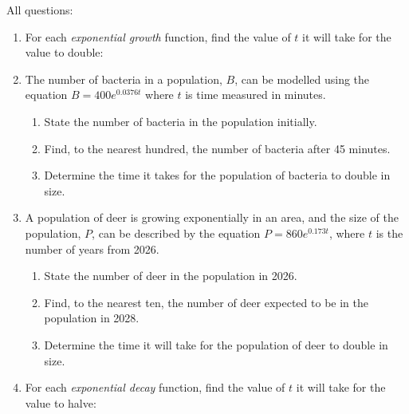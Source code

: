 \documentclass[
  11pt,
  openany]{book}
\begin{document}
All questions: \faCalculator

\vspace{-0.2cm}

\begin{enumerate}
    \item For each \textit{exponential growth} function, find the value of $t$ it will take for the value to double:
    \begin{enumerate}
    \end{enumerate}
    \item The number of bacteria in a population, $B$, can be modelled using the equation $B=400e^{0.0376t}$ where $t$ is time measured in minutes.
    \begin{enumerate}
        \item State the number of bacteria in the population initially.
        \item Find, to the nearest hundred, the number of bacteria after 45 minutes.
        \item Determine the time it takes for the population of bacteria to double in size.
    \end{enumerate}
    \item A population of deer is growing exponentially in an area, and the size of the population, $P$, can be described by the equation $P=860e^{0.173t}$, where $t$ is the number of years from 2026.
    \begin{enumerate}
        \item State the number of deer in the population in 2026.
        \item Find, to the nearest ten, the number of deer expected to be in the population in 2028.
        \item Determine the time it will take for the population of deer to double in size.
    \end{enumerate}
    \item For each \textit{exponential decay} function, find the value of $t$ it will take for the value to halve:
    \begin{enumerate}
\end{enumerate}
\end{enumerate}
\end{document}
